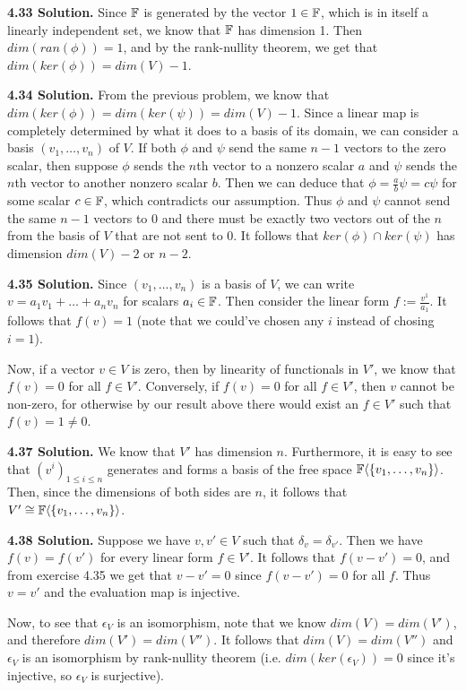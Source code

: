 \textbf{4.33 Solution.} Since $\mathbb{F}$ is generated by the vector $1 \in \mathbb{F}$, which is in itself a linearly independent set, we know that $\mathbb{F}$ has dimension 1. Then $dim(ran(\phi)) = 1$, and by the rank-nullity theorem, we get that $dim(ker(\phi)) = dim(V) - 1$.

\textbf{4.34 Solution.} From the previous problem, we know that $dim(ker(\phi)) = dim(ker(\psi)) = dim(V) - 1$. Since a linear map is completely determined by what it does to a basis of its domain, we can consider a basis $(v_1, \dots, v_n)$ of $V$. If both $\phi$ and $\psi$ send the same $n-1$ vectors to the zero scalar, then suppose $\phi$ sends the $n$th vector to a nonzero scalar $a$ and $\psi$ sends the $n$th vector to another nonzero scalar $b$. Then we can deduce that $\phi = \frac{a}{b}\psi = c\psi$ for some scalar $c \in \mathbb{F}$, which contradicts our assumption. Thus $\phi$ and $\psi$ cannot send the same $n-1$ vectors to 0 and there must be exactly two vectors out of the $n$ from the basis of $V$ that are not sent to 0. It follows that $ker(\phi) \cap ker(\psi)$ has dimension $dim(V) - 2$ or $n - 2$.

\textbf{4.35 Solution.} Since $(v_1, \dots, v_n)$ is a basis of $V$, we can write $v = a_1v_1 + \dots + a_nv_n$ for scalars $a_i \in \mathbb{F}$. Then consider the linear form $f:= \frac{v^1}{a_1}$. It follows that $f(v) = 1$ (note that we could've chosen any $i$ instead of chosing $i = 1$).

Now, if a vector $v \in V$ is zero, then by linearity of functionals in $V'$, we know that $f(v) = 0$ for all $f \in V'$. Conversely, if $f(v) = 0$ for all $f \in V'$, then $v$ cannot be non-zero, for otherwise by our result above there would exist an $f \in V'$ such that $f(v) = 1 \neq 0$.

\textbf{4.37 Solution.} We know that $V'$ has dimension $n$. Furthermore, it is easy to see that $(v^i)_{1 \leq i \leq n}$ generates and forms a basis of the free space $\mathbb{F}\langle\{v_1, \dots, v_n\}\rangle$. Then, since the dimensions of both sides are $n$, it follows that $V' \cong \mathbb{F}\langle\{v_1, \dots, v_n\}\rangle$.

\textbf{4.38 Solution.} Suppose we have $v, v' \in V$ such that $\delta_v = \delta_{v'}$. Then we have $f(v) = f(v')$ for every linear form $f \in V'$. It follows that $f(v-v') = 0$, and from exercise 4.35 we get that $v-v' = 0$ since $f(v-v') = 0$ for all $f$. Thus $v = v'$ and the evaluation map is injective.

Now, to see that $\epsilon_V$ is an isomorphism, note that we know $dim(V) = dim(V')$, and therefore $dim(V') = dim(V'')$. It follows that $dim(V) = dim(V'')$ and $\epsilon_V$ is an isomorphism by rank-nullity theorem (i.e. $dim(ker(\epsilon_V)) = 0$ since it's injective, so $\epsilon_V$ is surjective).

